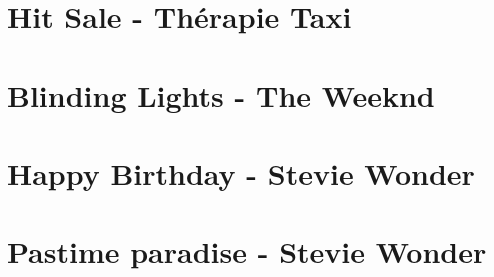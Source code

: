 \documentclass{guitartabs}
\begin{document}
\section{Hit Sale - Thérapie Taxi}
\begin{guitar}

\end{guitar}


\section{Blinding Lights - The Weeknd}
\begin{guitar}

\end{guitar}


\section{Happy Birthday - Stevie Wonder}
\begin{guitar}

\end{guitar}



\section{Pastime paradise - Stevie Wonder}
\begin{guitar}

\end{guitar}
\end{document}
